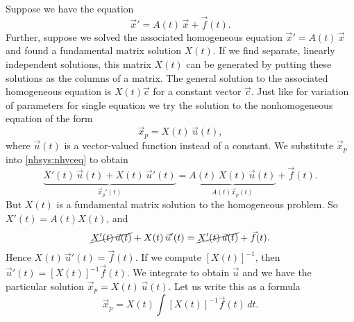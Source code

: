 \documentclass{ximera}
\begin{document}
Suppose we have the equation
\begin{equation} \label{nhsys:nhvceq}
    {\vec{x}}' = A(t) \, \vec{x} + \vec{f}(t) .
\end{equation}
Further, suppose we solved the associated homogeneous equation ${\vec{x}}' = A(t) \, \vec{x}$ and found a fundamental matrix solution $X(t)$. If we find separate, linearly independent solutions, this matrix $X(t)$ can be generated by putting these solutions as the columns of a matrix. The general solution to the associated homogeneous equation is $X(t) \vec{c}$ for a constant vector $\vec{c}$.  Just like for variation of parameters for single equation we try the solution to the nonhomogeneous equation of the form
\begin{equation*}
    \vec{x}_p = X(t)\, \vec{u}(t) ,
\end{equation*}
where $\vec{u}(t)$ is a vector-valued function instead of a constant. We substitute $\vec{x}_p$ into \eqref{nhsys:nhvceq} to obtain
\begin{equation*}
\underbrace{
    X'(t)\, \vec{u}(t) + X(t)\, {\vec{u}}'(t)
}%
_{{\vec{x}_p}'(t)}
= \underbrace{
    A(t)\, X(t)\, \vec{u}(t)
}%
_{A(t) \vec{x}_p (t)} + \vec{f}(t) .
\end{equation*}
    But $X(t)$ is a fundamental matrix solution to the homogeneous problem. So $X'(t) = A(t)X(t)$, and
\begin{equation*}
    \cancel{X'(t)\, \vec{u}(t)} + X(t)\, {\vec{u}}'(t) = \cancel{X'(t)\, \vec{u}(t)} + \vec{f}(t) .
\end{equation*}
Hence $X(t)\, {\vec{u}}'(t) = \vec{f}(t)$.  If we compute $\left[X(t)\right]^{-1}$, then ${\vec{u}}'(t) = \left[X(t)\right]^{-1}\vec{f}(t)$.  We integrate to obtain $\vec{u}$ and we have the particular solution $\vec{x}_p = X(t)\, \vec{u}(t)$. Let us write this as a formula
\begin{equation*}
    \vec{x}_p = 
    X(t)
    \int \left[X(t)\right]^{-1}\vec{f}(t) \, dt .
\end{equation*}

\end{document}
